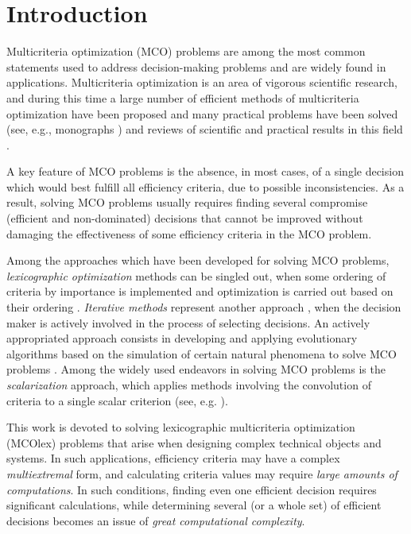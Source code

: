 \documentclass[smallextended]{svjour3}       %
\begin{document}
\section{Introduction}
\label{sec:1}

Multicriteria optimization (MCO) problems are among the most common statements used to address decision-making problems and are widely found in applications. Multicriteria optimization is an area of vigorous scientific research, and during this time a large number of efficient methods of multicriteria optimization have been proposed and many practical problems have been solved (see, e.g., monographs \cite{c1,c2,c3,c4}) and reviews of scientific and practical results in this field \cite{c6,c7,c8,c9}.

A key feature of MCO problems is the absence, in most cases, of a single decision which would best fulfill all efficiency criteria, due to possible inconsistencies. As a result, solving MCO problems usually requires finding several compromise (efficient and non-dominated) decisions that cannot be improved without damaging the effectiveness of some efficiency criteria in the MCO problem.

Among the approaches which have been developed for solving MCO problems, \textit{lexicographic optimization} methods can be singled out, when some ordering of criteria by importance is implemented and optimization is carried out based on their ordering \cite{c3}. \textit{Iterative methods} represent another approach \cite{c6,c10}, when the decision maker is actively involved in the process of selecting decisions. An actively appropriated approach consists in developing and applying evolutionary algorithms based on the simulation of certain natural phenomena to solve MCO problems \cite{c10,c11,c12,c13}. Among the widely used endeavors in solving MCO problems is the \textit{scalarization} approach, which applies methods involving the convolution of criteria to a single scalar criterion (see, e.g. \cite{c2,c14}).

This work is devoted to solving lexicographic multicriteria optimization (MCOlex) problems that arise when designing complex technical objects and systems. In such applications, efficiency criteria may have a complex \textit{multiextremal} form, and calculating criteria values may require \textit{large amounts of computations}. In such conditions, finding even one efficient decision requires significant calculations, while determining several (or a whole set) of efficient decisions becomes an issue of \textit{great computational complexity}.
\end{document}
